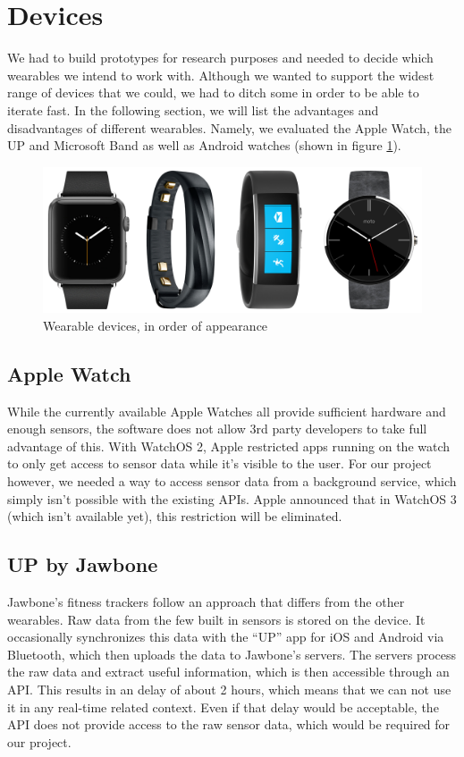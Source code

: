 \section{Devices}
\label{sec:devices}

We had to build prototypes for research purposes and needed to decide which wearables we intend to work with.
Although we wanted to support the widest range of devices that we could, we had to ditch some in order to be able to iterate fast.
In the following section, we will list the advantages and disadvantages of different wearables.
Namely, we evaluated the Apple Watch, the UP and Microsoft Band as well as Android watches (shown in figure \ref{fig:devices}).

\begin{figure}[H]
	\includegraphics[width=\linewidth]{images/devices.png}
	\caption[Caption for devices]{Wearable devices, in order of appearance}
	\label{fig:devices}
\end{figure}

\subsection{Apple Watch}
While the currently available Apple Watches all provide sufficient hardware and enough sensors, the software does not allow 3rd party developers to take full advantage of this.
With WatchOS 2, Apple restricted apps running on the watch to only get access to sensor data while it's visible to the user.
For our project however, we needed a way to access sensor data from a background service, which simply isn't possible with the existing APIs.
Apple announced that in WatchOS 3 (which isn't available yet), this restriction will be eliminated. 

\subsection{UP by Jawbone}
Jawbone's fitness trackers follow an approach that differs from the other wearables.
Raw data from the few built in sensors is stored on the device.
It occasionally synchronizes this data with the ``UP'' app for iOS and Android via Bluetooth, which then uploads the data to Jawbone's servers.
The servers process the raw data and extract useful information, which is then accessible through an API.
This results in an delay of about 2 hours, which means that we can not use it in any real-time related context.
Even if that delay would be acceptable, the API does not provide access to the raw sensor data, which would be required for our project.

